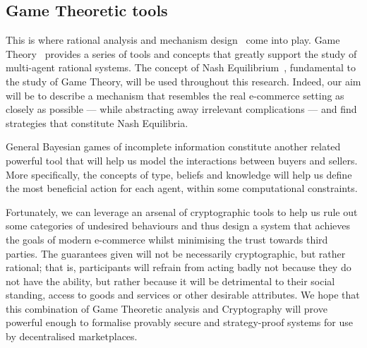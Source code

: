 \subsection{Game Theoretic tools}
  This is where rational analysis and mechanism design~\cite{nisan2007algorithmic} come
  into play. Game Theory~\cite{leyton2008essentials} provides a series of tools and
  concepts that greatly support the study of multi-agent rational systems. The concept of
  Nash Equilibrium~\cite{nasheqcomp}, fundamental to the study of Game Theory, will be
  used throughout this research. Indeed, our aim will be to describe a mechanism that
  resembles the real e-commerce setting as closely as possible --- while abstracting away
  irrelevant complications --- and find strategies that constitute Nash Equilibria.

  General Bayesian games of incomplete information constitute another related powerful
  tool that will help us model the interactions between buyers and sellers. More
  specifically, the concepts of type, beliefs and knowledge will help us define the most
  beneficial action for each agent, within some computational constraints.

  Fortunately, we can leverage an arsenal of cryptographic tools to help us rule out some
  categories of undesired behaviours and thus design a system that achieves the goals of
  modern e-commerce whilst minimising the trust towards third parties. The guarantees
  given will not be necessarily cryptographic, but rather rational; that is, participants
  will refrain from acting badly not because they do not have the ability, but rather
  because it will be detrimental to their social standing, access to goods and services or
  other desirable attributes. We hope that this combination of Game Theoretic analysis and
  Cryptography will prove powerful enough to formalise provably secure and strategy-proof
  systems for use by decentralised marketplaces.
